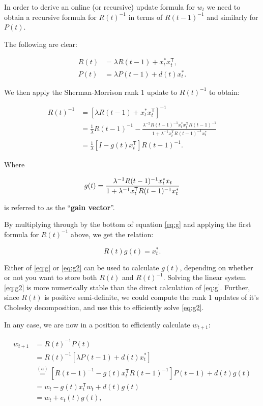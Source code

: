 \documentclass[a4paper, 12pt]{article}
\def\T{\mathsf{T}}
\begin{document}
In order to derive an online (or recursive) update formula for $w_t$ we need to obtain a recursive formula for $R(t)^{-1}$ in terms of $R(t - 1)^{-1}$ and similarly for $P(t)$.

The following are clear:

\begin{align}
R(t) &= \lambda R(t - 1) + x_t^* x_t^\T,\\
P(t) &= \lambda P(t - 1) + d(t)x_t^*.
\end{align}

We then apply the Sherman-Morrison rank 1 update to $R(t)^{-1}$ to obtain:

\begin{align*}
  R(t)^{-1} &= [\lambda R(t - 1) + x_t^*x_t^\T]^{-1} \\
  &= \frac{1}{\lambda}R(t - 1)^{-1} - \frac{\lambda^{-2}R(t - 1)^{-1}x_t^*x_t^\T R(t - 1)^{-1}}{1 + \lambda^{-1}x_t^\T R(t - 1)^{-1}x_t^*} \\
  &= \frac{1}{\lambda}[I - g(t)x_t^\T]R(t - 1)^{-1}.
\end{align*}

Where

 \begin{equation}
 \label{eq:g}
   g(t) = \frac{\lambda^{-1}R(t - 1)^{-1}x_t^*x_t}{1 + \lambda^{-1}x_t^\T R(t - 1)^{-1} x_t^*} \\
 \end{equation}

is referred to as the ``\textbf{gain vector}''.

By multiplying through by the bottom of equation \ref{eq:g} and applying the first formula for $R(t)^{-1}$ above, we get the relation:

\begin{equation}
\label{eq:g2}
  R(t)g(t) = x_t^*.
\end{equation}

Either of \ref{eq:g} or \ref{eq:g2} can be used to calculate $g(t)$, depending on whether or not you want to store both $R(t)$ and $R(t)^{-1}$.  Solving the linear system \ref{eq:g2} is more numerically stable than the direct calculation of \ref{eq:g}.  Further, since $R(t)$ is positive semi-definite, we could compute the rank 1 updates of it's Cholesky decomposition, and use this to efficiently solve \ref{eq:g2}.

In any case, we are now in a position to efficiently calculate $w_{t + 1}$:

\begin{align*}
  w_{t + 1} &= R(t)^{-1}P(t) \\
  &= R(t)^{-1}[\lambda P(t - 1) + d(t)x_t^*] \\
  &\overset{(a)}{=} [R(t - 1)^{-1} - g(t)x_t^\T R(t - 1)^{-1}]P(t - 1) + d(t)g(t) \\
  &= w_t - g(t)x_t^\T w_t + d(t)g(t)\\
  &= w_t + e_t(t) g(t),
\end{align*}
\end{document}
